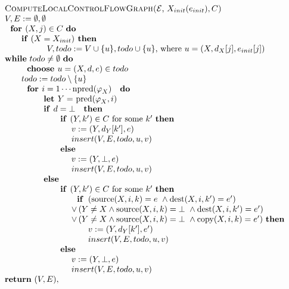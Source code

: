 \begin{equation*}
\begin{tabular}{l}
\textsc{ComputeLocalControlFlowGraph(}$\mathcal{E}$, $X_{init}(e_{init}),C$%
\textsc{)} \\ 
$V,E:=\emptyset ,\emptyset $ \\ 
$\text{\textbf{for }}(X,j)\in C$ \textbf{do} \\ 
$\qquad $\textbf{if} $(X=X_{init})$\textbf{\ then} \\ 
$\qquad \qquad \text{\textbf{\ }}V,todo:=V\cup \{u\},todo\cup \{u\}$, where $%
u=(X,d_{X}[j],e_{init}[j])$ \\ 
\textbf{while} $todo\neq \emptyset $ \textbf{do} \\ 
$\qquad \text{\textbf{choose }}u=(X,d,e)\in todo$ \\ 
$\qquad todo:=todo\setminus \{u\}$ \\ 
$\qquad \text{\textbf{for }}i=1\cdots \mathrm{npred}(\varphi _{X})\text{ 
\textbf{do}}$ \\ 
$\qquad \qquad \text{\textbf{let }}Y=$ $\mathrm{pred}(\varphi _{X},i)$ \\ 
$\qquad \qquad \text{\textbf{if }}d=\bot $ $\text{\textbf{then}}$ \\ 
$\qquad \qquad \qquad \text{\textbf{if }}(Y,k^{\prime })\in C$ for some $%
k^{\prime }$ \textbf{then} \\ 
$\qquad \qquad \qquad \qquad v:=(Y,d_{Y}[k^{\prime }],e)$ \\ 
$\qquad \qquad \qquad \qquad insert(V,E,todo,u,v)$ \\ 
$\qquad \qquad \qquad \text{\textbf{else}}$ \\ 
$\qquad \qquad \qquad \qquad v:=(Y,\bot ,e)$ \\ 
$\qquad \qquad \qquad \qquad insert(V,E,todo,u,v)$ \\ 
$\qquad \qquad \text{\textbf{else}}$ \\ 
$\qquad \qquad \qquad \text{\textbf{if }}(Y,k^{\prime })\in C$ for some $%
k^{\prime }$ \textbf{then} \\ 
$\qquad \qquad \qquad \qquad \text{\textbf{if }}\left( \mathrm{source}%
(X,i,k)=e\mathbf{\ }\wedge \mathrm{dest}(X,i,k^{\prime })=e^{\prime }\right) 
$ \\ 
$\qquad \qquad \qquad \qquad \vee \left( Y\neq X\wedge \mathrm{source}%
(X,i,k)=\bot \mathbf{\ }\wedge \mathrm{dest}(X,i,k^{\prime })=e^{\prime
}\right) $ \\ 
$\qquad \qquad \qquad \qquad \vee \left( Y\neq X\wedge \mathrm{source}%
(X,i,k)=\bot \mathbf{\ }\wedge \mathrm{copy}(X,i,k)=e^{\prime }\right) $ 
\textbf{then} \\ 
$\qquad \qquad \qquad \qquad \qquad v:=(Y,d_{Y}[k^{\prime }],e^{\prime })$
\\ 
$\qquad \qquad \qquad \qquad \qquad insert(V,E,todo,u,v)\qquad $ \\ 
$\qquad \qquad \qquad \text{\textbf{else}}$ \\ 
$\qquad \qquad \qquad \qquad v:=(Y,\bot ,e)$ \\ 
$\qquad \qquad \qquad \qquad insert(V,E,todo,u,v)\qquad $ \\ 
\textbf{return} $(V,E),$%
\end{tabular}%
\end{equation*}%
